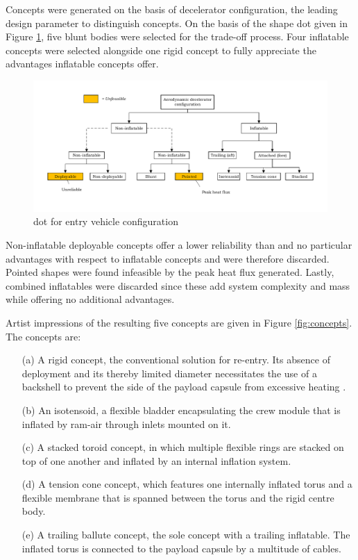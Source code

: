 Concepts were generated on the basis of decelerator configuration, the leading design parameter to distinguish concepts. On the basis of the shape \acrfull{dot} given in Figure \ref{fig:dotshape}, five blunt bodies were selected for the trade-off process. Four inflatable concepts were selected alongside one rigid concept to fully appreciate the advantages inflatable concepts offer.

\begin{figure}[h]
\hspace{-23mm}
\includegraphics[width = 1.25\textwidth]{Figure/Concepts/DOT_configuration.pdf}
\vspace{-5mm}
\caption{\acrfull{dot} for entry vehicle configuration}
\label{fig:dotshape}
\end{figure}

Non-inflatable deployable concepts offer a lower reliability than and no particular advantages with respect to inflatable concepts and were therefore discarded. Pointed shapes were found infeasible by the peak heat flux generated. Lastly, combined inflatables were discarded since these add system complexity and mass while offering no additional advantages. 

Artist impressions of the resulting five concepts are given in Figure \ref{fig:concepts}. The concepts are:
\begin{itemize}
\item[(a)] A rigid concept, the conventional solution for re-entry. Its absence of deployment and its thereby limited diameter necessitates the use of a backshell to prevent the side of the payload capsule from excessive heating \cite{Hughes2005}.
\item[(b)] An isotensoid, a flexible bladder encapsulating the crew module that is inflated by ram-air through inlets mounted on it.
\item[(c)] A stacked toroid concept, in which multiple flexible rings are stacked on top of one another and inflated by an internal inflation system.
\item[(d)] A tension cone concept, which features one internally inflated torus and a flexible membrane that is spanned between the torus and the rigid centre body.
\item[(e)] A trailing ballute concept, the sole concept with a trailing inflatable. The inflated torus is connected to the payload capsule by a multitude of cables.
\end{itemize}

